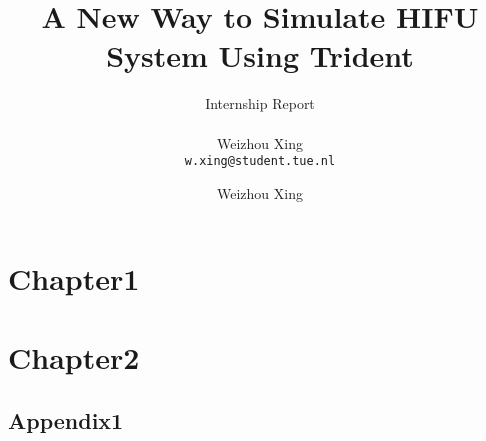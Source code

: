 \documentclass[11pt,a4paper]{report}
\title{A New Way to Simulate HIFU System Using Trident}
\subtitle{Internship Report \\~\\ \small{Weizhou Xing \\ \texttt{w.xing@student.tue.nl}}}
\author{Weizhou Xing}
\begin{document}
\maketitle
\tableofcontents



\chapter{Chapter1}


\chapter{Chapter2}


\begin{appendices}
\chapter{Appendix1}

\end{appendices}

\printbibliography[
heading=bibintoc,
title={References}
] %

\clearpage
\end{document}
